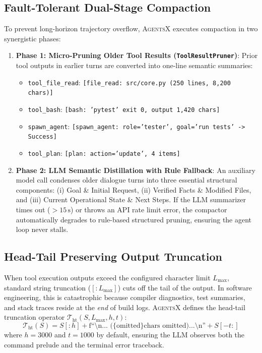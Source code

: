 \documentclass[10pt,twocolumn,letterpaper]{article}
\begin{document}
\subsection{Fault-Tolerant Dual-Stage Compaction}
To prevent long-horizon trajectory overflow, \textsc{AgentsX} executes compaction in two synergistic phases:
\begin{enumerate}
    \item \textbf{Phase 1: Micro-Pruning Older Tool Results (\texttt{ToolResultPruner})}: Prior tool outputs in earlier turns are converted into one-line semantic summaries:
    \begin{itemize}
        \item \texttt{tool\_file\_read}: \texttt{[file\_read: src/core.py (250 lines, 8,200 chars)]}
        \item \texttt{tool\_bash}: \texttt{[bash: 'pytest' exit 0, output 1,420 chars]}
        \item \texttt{spawn\_agent}: \texttt{[spawn\_agent: role='tester', goal='run tests' -> Success]}
        \item \texttt{tool\_plan}: \texttt{[plan: action='update', 4 items]}
    \end{itemize}
    \item \textbf{Phase 2: LLM Semantic Distillation with Rule Fallback}: An auxiliary model call condenses older dialogue turns into three essential structural components: (i) Goal \& Initial Request, (ii) Verified Facts \& Modified Files, and (iii) Current Operational State \& Next Steps. If the LLM summarizer times out ($>15\,\text{s}$) or throws an API rate limit error, the compactor automatically degrades to rule-based structured pruning, ensuring the agent loop never stalls.
\end{enumerate}

\subsection{Head-Tail Preserving Output Truncation}
When tool execution outputs exceed the configured character limit $L_{\max}$, standard string truncation ($[:L_{\max}]$) cuts off the tail of the output. In software engineering, this is catastrophic because compiler diagnostics, test summaries, and stack traces reside at the \emph{end} of build logs. \textsc{AgentsX} defines the head-tail truncation operator $\mathcal{T}_{\text{ht}}(S, L_{\max}, h, t)$:
\begin{equation}
\mathcal{T}_{\text{ht}}(S) = S[:h] + \text{f``\textbackslash n... (\{omitted\} chars omitted)...\textbackslash n''} + S[-t:]
\end{equation}
where $h=3000$ and $t=1000$ by default, ensuring the LLM observes both the command prelude and the terminal error traceback.
\end{document}
